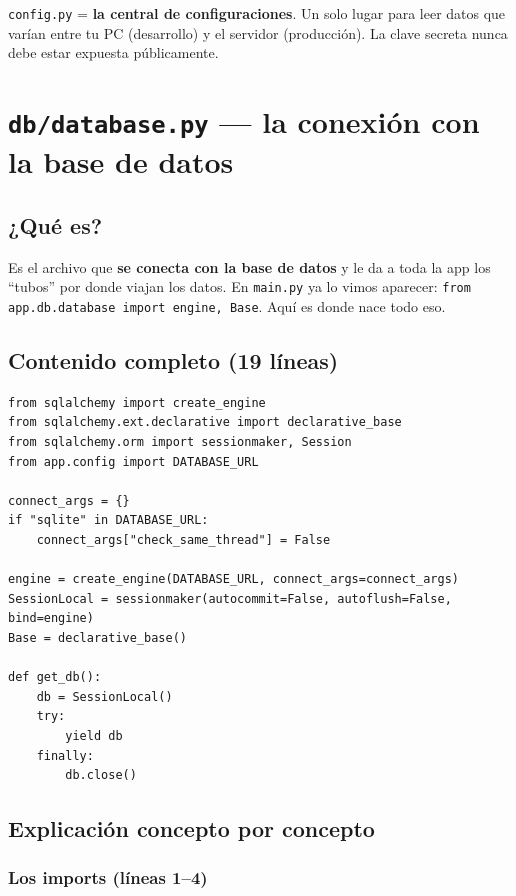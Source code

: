 \documentclass[11pt,a4paper]{article}
\begin{document}
\begin{recuadro}
\texttt{config.py} = \textbf{la central de configuraciones}. Un solo lugar para leer datos que
varían entre tu PC (desarrollo) y el servidor (producción). La clave secreta nunca debe estar
expuesta públicamente.
\end{recuadro}

\section{\texttt{db/database.py} --- la conexión con la base de datos}

\subsection{¿Qué es?}

Es el archivo que \textbf{se conecta con la base de datos} y le da a toda la app los ``tubos''
por donde viajan los datos. En \texttt{main.py} ya lo vimos aparecer:
\texttt{from app.db.database import engine, Base}. Aquí es donde nace todo eso.

\subsection{Contenido completo (19 líneas)}

\begin{lstlisting}
from sqlalchemy import create_engine
from sqlalchemy.ext.declarative import declarative_base
from sqlalchemy.orm import sessionmaker, Session
from app.config import DATABASE_URL

connect_args = {}
if "sqlite" in DATABASE_URL:
    connect_args["check_same_thread"] = False

engine = create_engine(DATABASE_URL, connect_args=connect_args)
SessionLocal = sessionmaker(autocommit=False, autoflush=False, bind=engine)
Base = declarative_base()

def get_db():
    db = SessionLocal()
    try:
        yield db
    finally:
        db.close()
\end{lstlisting}

\subsection{Explicación concepto por concepto}

\subsubsection{Los imports (líneas 1--4)}
\end{document}
